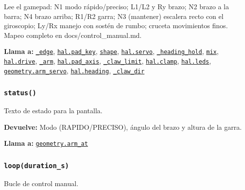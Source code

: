 Lee el gamepad: N1 modo rápido/preciso; L1/L2 y Ry brazo; N2 brazo a la barra; N4 brazo arriba; R1/R2 garra; N3 (mantener) escalera recto con el giroscopio; Ly/Rx manejo con sostén de rumbo; cruceta movimientos finos. Mapeo completo en docs/control\_manual.md.

\par{}\par\smallskip
\noindent\textbf{Llama a:} \hyperref[fn:manual:-edge]{\texttt{\_\allowbreak{}edge}}, \hyperref[fn:hal:pad-key]{\texttt{hal.pad\_\allowbreak{}key}}, \hyperref[fn:manual:shape]{\texttt{shape}}, \hyperref[fn:hal:servo]{\texttt{hal.servo}}, \hyperref[fn:manual:-heading-hold]{\texttt{\_\allowbreak{}heading\_\allowbreak{}hold}}, \hyperref[fn:manual:mix]{\texttt{mix}}, \hyperref[fn:hal:drive]{\texttt{hal.drive}}, \hyperref[fn:manual:-arm]{\texttt{\_\allowbreak{}arm}}, \hyperref[fn:hal:pad-axis]{\texttt{hal.pad\_\allowbreak{}axis}}, \hyperref[fn:manual:-claw-limit]{\texttt{\_\allowbreak{}claw\_\allowbreak{}limit}}, \hyperref[fn:hal:clamp]{\texttt{hal.clamp}}, \hyperref[fn:hal:leds]{\texttt{hal.leds}}, \hyperref[fn:geometry:arm-servo]{\texttt{geometry.arm\_\allowbreak{}servo}}, \hyperref[fn:hal:heading]{\texttt{hal.heading}}, \hyperref[fn:manual:-claw-dir]{\texttt{\_\allowbreak{}claw\_\allowbreak{}dir}}\par

\subsubsection{\texttt{status()}}\label{fn:manual:status}
\noindent Texto de estado para la pantalla.

\noindent\textbf{Devuelve:} Modo (RAPIDO/PRECISO), ángulo del brazo y altura de la garra.\par
\noindent\textbf{Llama a:} \hyperref[fn:geometry:arm-at]{\texttt{geometry.arm\_\allowbreak{}at}}\par

\subsubsection{\texttt{loop(duration\_\allowbreak{}s)}}\label{fn:manual:loop}
\noindent Bucle de control manual.

